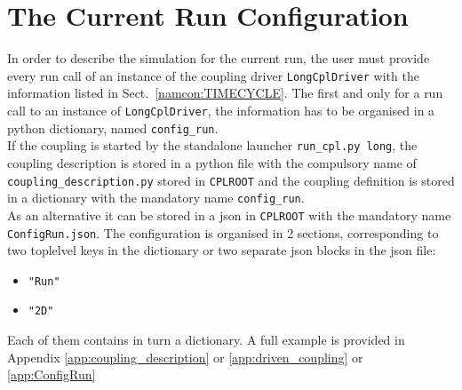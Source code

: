 \section{The Current Run Configuration}\label{json:ConfigRun}
In order to describe the simulation for the current run, the user must provide every
run call of an instance of the coupling driver \texttt{LongCplDriver}
with the information listed in Sect.~\ref{namcon:TIMECYCLE}.
The first and only for a run call to an instance of
\texttt{LongCplDriver}, the information has to be
organised in a python dictionary, named \texttt{config\_run}.\\

If the coupling is started by the standalone launcher
\texttt{run\_cpl.py long}, the coupling description is stored in
a python file with the compulsory name of \texttt{coupling\_description.py} stored in
\texttt{CPLROOT} and the coupling definition is stored in a
dictionary with the mandatory name \texttt{config\_run}.\\
As an alternative it can be stored in a json in
\texttt{CPLROOT} with the mandatory name\\
\texttt{ConfigRun.json}. The configuration is organised in 2 sections, corresponding
to two toplelvel keys in the dictionary or two separate json
blocks in the json file:
\begin{itemize}
\item\texttt{"Run"}
\item\texttt{"2D"}
\end{itemize}

Each of them contains in turn a dictionary. A full example is provided in Appendix  \ref{app:coupling_description}
or \ref{app:driven_coupling} or \ref{app:ConfigRun}

